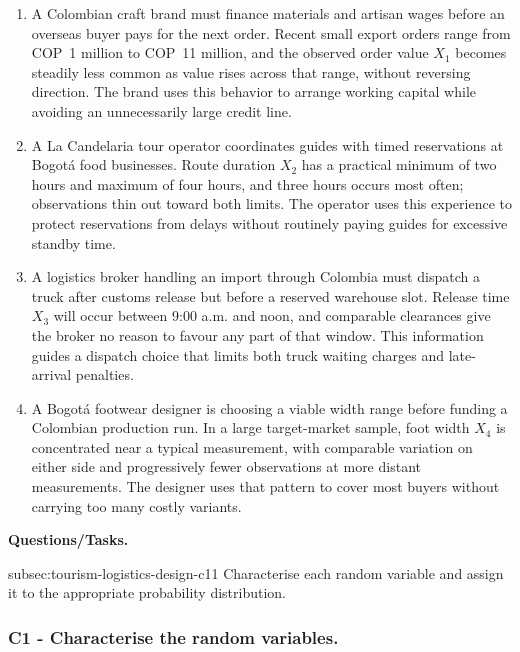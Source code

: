 	\begin{enumerate}
		\item A Colombian craft brand must finance materials and artisan wages before an overseas buyer pays for the next order. Recent small export orders range from COP~1 million to COP~11 million, and the observed order value \(X_1\) becomes steadily less common as value rises across that range, without reversing direction. The brand uses this behavior to arrange working capital while avoiding an unnecessarily large credit line.
		\item A La Candelaria tour operator coordinates guides with timed reservations at Bogotá food businesses. Route duration \(X_2\) has a practical minimum of two hours and maximum of four hours, and three hours occurs most often; observations thin out toward both limits. The operator uses this experience to protect reservations from delays without routinely paying guides for excessive standby time.
		\item A logistics broker handling an import through Colombia must dispatch a truck after customs release but before a reserved warehouse slot. Release time \(X_3\) will occur between 9:00 a.m. and noon, and comparable clearances give the broker no reason to favour any part of that window. This information guides a dispatch choice that limits both truck waiting charges and late-arrival penalties.
		\item A Bogotá footwear designer is choosing a viable width range before funding a Colombian production run. In a large target-market sample, foot width \(X_4\) is concentrated near a typical measurement, with comparable variation on either side and progressively fewer observations at more distant measurements. The designer uses that pattern to cover most buyers without carrying too many costly variants.
	\end{enumerate}

	\textbf{Questions/Tasks.}
	\begin{enumerate}
		\CriterionTask
		{subsec:tourism-logistics-design-c1}{1}
		{Characterise each random variable and assign it to the appropriate probability distribution.}
	\end{enumerate}

	\subsubsection*{C1 - Characterise the random variables.}
	\label{subsec:tourism-logistics-design-c1}

